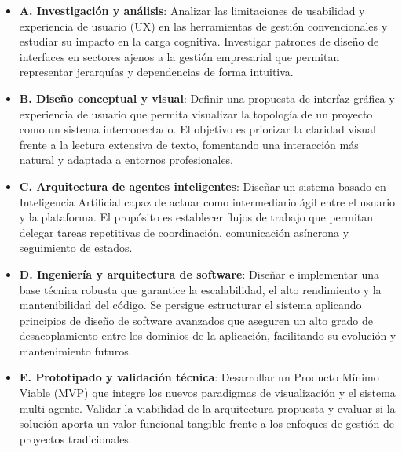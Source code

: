 \begin{itemize}
    \item \textbf{A. Investigación y análisis}: Analizar las limitaciones de usabilidad y experiencia de usuario (UX) en las herramientas de gestión convencionales y estudiar su impacto en la carga cognitiva. Investigar patrones de diseño de interfaces en sectores ajenos a la gestión empresarial que permitan representar jerarquías y dependencias de forma intuitiva.
    
    \item \textbf{B. Diseño conceptual y visual}: Definir una propuesta de interfaz gráfica y experiencia de usuario que permita visualizar la topología de un proyecto como un sistema interconectado. El objetivo es priorizar la claridad visual frente a la lectura extensiva de texto, fomentando una interacción más natural y adaptada a entornos profesionales.
    
    \item \textbf{C. Arquitectura de agentes inteligentes}: Diseñar un sistema basado en Inteligencia Artificial capaz de actuar como intermediario ágil entre el usuario y la plataforma. El propósito es establecer flujos de trabajo que permitan delegar tareas repetitivas de coordinación, comunicación asíncrona y seguimiento de estados.
    
    \item \textbf{D. Ingeniería y arquitectura de software}: Diseñar e implementar una base técnica robusta que garantice la escalabilidad, el alto rendimiento y la mantenibilidad del código. Se persigue estructurar el sistema aplicando principios de diseño de software avanzados que aseguren un alto grado de desacoplamiento entre los dominios de la aplicación, facilitando su evolución y mantenimiento futuros.
    
    \item \textbf{E. Prototipado y validación técnica}: Desarrollar un Producto Mínimo Viable (MVP) que integre los nuevos paradigmas de visualización y el sistema multi-agente. Validar la viabilidad de la arquitectura propuesta y evaluar si la solución aporta un valor funcional tangible frente a los enfoques de gestión de proyectos tradicionales.
\end{itemize}